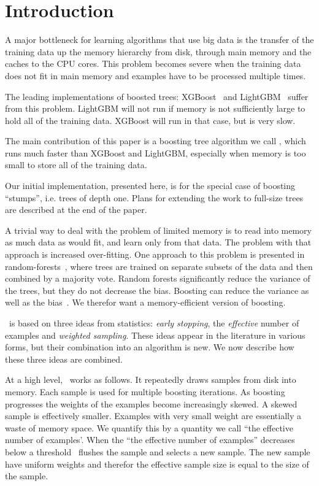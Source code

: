 \section{Introduction}\label{sec:intro}
A major bottleneck for learning algorithms that use big data is the
transfer of the training data up the memory hierarchy from disk,
through main memory and the caches to the CPU cores. This problem
becomes severe when the training data does not fit in main memory and
examples have to be processed multiple times.

The leading implementations of boosted trees: XGBoost~\cite{chen_xgboost:_2016} and
LightGBM~\cite{ke_lightgbm:_2017} suffer from this problem. LightGBM
will not run if memory is not sufficiently large to hold all of the
training data. XGBoost will run in that case, but is very slow.

The main contribution of this paper is a boosting tree algorithm we
call \Sparrow, which runs much faster than XGBoost and LightGBM,
especially when memory is too small to store all of the training data.

Our initial implementation, presented here, is for the special case of
boosting ``stumps'', i.e. trees of depth one. Plans for extending the
work to full-size trees are described at the end of the paper.

A trivial way to deal with the problem of limited memory is to read
into memory as much data as would fit, and learn only from that data.
The problem with that approach is increased over-fitting. One approach
to this problem is presented in random-forests~\cite{hastie_elements_2009},
where trees are trained on separate subsets of the data and then
combined by a majority vote. Random forests significantly reduce the
variance of the trees, but they do not decrease the bias. Boosting can
reduce the variance as well as the bias~\cite{schapire_boosting_1998}. We
therefor want a memory-efficient version of boosting.

\Sparrow\ is based on three ideas from statistics: {\em early stopping},
the {\em effective} number of examples and {\em weighted
  sampling}. These ideas appear in the literature in various forms, but their
combination into an algorithm is new. We now describe how these three
ideas are combined.

At a high level, \Sparrow\ works as follows. It repeatedly draws
samples from disk into memory. Each sample is
used for multiple boosting iterations. As boosting progresses the
weights of the examples become increasingly skewed. A skewed sample is
effectively smaller. Examples with very small weight are essentially a
waste of memory space. We quantify this by a quantity we call ``the
effective number of examples'. When the  ``the effective number
of examples'' decreases below a threshold \Sparrow\ flushes the sample
and selects a new sample. The new sample have uniform weights and
therefor the effective sample size is equal to the size of the sample.

